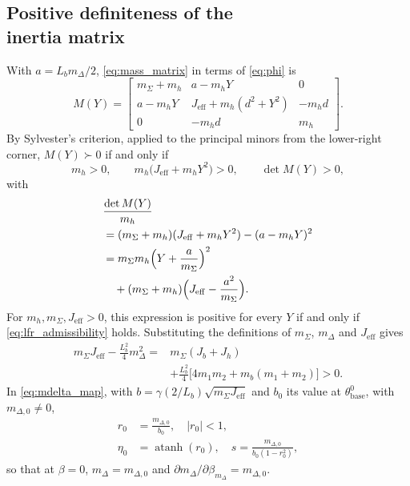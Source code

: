 \subsection[Positive definiteness of the inertia matrix]{Positive definiteness of the\\ inertia matrix}
\label{app:lfr-wellposed}
With $a=L_bm_\Delta/2$, \eqref{eq:mass_matrix} in terms of \eqref{eq:phi} is
\begin{equation*}
M(Y)=\begin{bmatrix}
 m_\Sigma+m_h & a-m_hY & 0\\
 a-m_hY & J_{\mathrm{eff}}+m_h(d^2+Y^2) & -m_hd\\
 0 & -m_hd & m_h
\end{bmatrix}.
\end{equation*}
By Sylvester's criterion, applied to the principal minors from the
lower-right corner, $M(Y)\succ0$ if and only if
\begin{equation*}
 m_h>0,\qquad m_h\bigl(J_{\mathrm{eff}}+m_hY^2\bigr)>0,\qquad \det M(Y)>0,
\end{equation*}
with
\begin{equation*}
\begin{aligned}
 &\frac{\det M(Y)}{m_h}\\
 &=(m_\Sigma+m_h)(J_{\mathrm{eff}}+m_hY^2)-(a-m_hY)^2\\
 &=m_\Sigma m_h\Bigl(Y+\frac{a}{m_\Sigma}\Bigr)^2\\
 &\quad +(m_\Sigma+m_h)\Bigl(J_{\mathrm{eff}}-\frac{a^2}{m_\Sigma}\Bigr).
\end{aligned}
\end{equation*}
For $m_h,m_\Sigma,J_{\mathrm{eff}}>0$, this expression is positive for every
$Y$ if and only if \eqref{eq:lfr_admissibility} holds.
Substituting the definitions of $m_\Sigma$, $m_\Delta$ and $J_{\mathrm{eff}}$ gives
\begin{equation*}
\begin{aligned}
 m_\Sigma J_{\mathrm{eff}}-\tfrac{L_b^2}{4}m_\Delta^2
 ={}&m_\Sigma(J_b+J_h)\\
 &+\tfrac{L_b^2}{4}\bigl[4m_1m_2+m_b(m_1+m_2)\bigr]>0.
\end{aligned}
\end{equation*}
In \eqref{eq:mdelta_map}, with
$b=\gamma(2/L_b)\sqrt{m_\Sigma J_{\mathrm{eff}}}$ and $b_0$ its value at
$\theta^0_{\mathrm{base}}$, with $m_{\Delta,0}\neq0$,
\begin{equation*}
\begin{aligned}
 r_0&=\frac{m_{\Delta,0}}{b_0},\quad \lvert r_0\rvert<1,\\
 \eta_0&=\operatorname{atanh}(r_0),\quad
 s=\frac{m_{\Delta,0}}{b_0(1-r_0^2)},
\end{aligned}
\end{equation*}
so that at $\beta=0$, $m_\Delta=m_{\Delta,0}$ and
$\partial m_\Delta/\partial\beta_{m_\Delta}=m_{\Delta,0}$.

